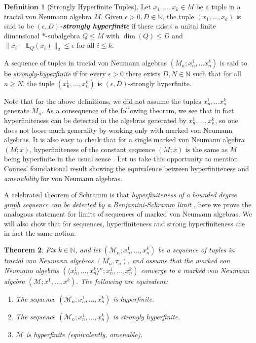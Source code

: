 \documentclass[11pt]{amsart}
\newcommand{\N}{{\mathbb{N}}}
\newtheorem{theorem}{Theorem}[section]
\theoremstyle{definition}
\newtheorem{definition}[theorem]{Definition}
\theoremstyle{remark}
\theoremstyle{definition}
\begin{document}
\begin{definition}[Strongly Hyperfinite Tuples]\label{def:strong hyperfinite tuple}
Let $x_1, \dots, x_k \in M$ be a tuple in a tracial von Neumann algebra $M$.
Given $\epsilon>0, D \in \N$, the tuple $(x_1, \dots, x_k)$ is said to be \textbf{\emph{$(\epsilon,D)$-strongly hyperfinite}} if  there exists a unital finite dimensional $*$-subalgebra $Q \leq  M$ with $\dim(Q) \leq D$ and $\| x_i - \mathbb E_Q(x_i) \|_2 \leq \epsilon$ for all $i \leq k$.

    A sequence of tuples in tracial von Neumann algebras $( M_n; x_n^1, \dots x_n^k)$ is said to be \emph{strongly-hyperfinite} if for every $\epsilon > 0$ there exists $D,N \in \N$ such that for all $n \geq N$, the tuple $(x_n^1, \dots, x_n^k)$ is $(\epsilon, D)$-strongly hyperfinite.
\end{definition}

Note that for the above definitions, we did not assume the tuples $x_n^1, \dots x_n^k$ generate $M_n$. 
As a consequence of the following theorem, we see that in fact hyperfiniteness can be detected in the algebras generated by $x_n^1, \dots, x_n^k$, so one does not loose much generality by working only with marked von Neumann algebras.
It is also easy to check that for a single marked von Neumann algebra $(M; \bar x)$, hyperfiniteness of the constant sequence $(M; \bar x)$ is the same as $M$ being hyperfinite in the usual sense \cite[Definition 11.1.2]{Popa}. 
Let us take this opportunity to mention Connes' foundational result \cite{Connes} showing the equivalence between hyperfiniteness and \emph{amenability} for von Neumann algebras.

A celebrated theorem of Schramm is that \emph{hyperfiniteness of a bounded degree graph sequence can be detected by a Benjamini-Schramm limit \cite{Schramm}}, here we prove the analogous statement for limits of sequences of marked von Neumann algebras.
We will also show that for sequences, hyperfiniteness and strong hyperfiniteness are in fact the same notion. 

\begin{theorem} \label{thm:vN_Schramm}
Fix $k \in \N$, and let $(\mathcal M_n; x_n^1, \dots ,x_n^k)$ be a sequence of tuples in tracial von Neumann algebras $(M_n, \tau_n)$, and assume that the marked von Neumann algebras $(\langle x_n^1, \dots , x_n^k \rangle''; x_n^1, \dots ,x_n^k)$ converge to a marked von Neumann algebra $(\mathcal M; x^1, \dots, x^k)$. The following are equivalent:
\begin{enumerate}
    \item The sequence $(\mathcal M_n; x_n^1, \dots ,x_n^k)$ is hyperfinite.
    \item The sequence $(\mathcal M_n; x_n^1, \dots ,x_n^k)$ is strongly hyperfinite.
    \item $\mathcal M$ is hyperfinite (equivalently, amenable).
\end{enumerate}
\end{theorem}
\end{document}
